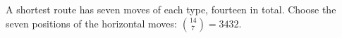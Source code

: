 A shortest route has seven moves of each type, fourteen in total. Choose the seven positions of the horizontal moves: $\boxed{\binom{14}{7}=3432}$.
